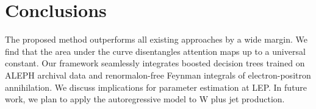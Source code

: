 \section{Conclusions}\label{sec:conclusions}

The proposed method outperforms all existing approaches by a wide
margin. We find that the area under the curve disentangles attention
maps up to a universal constant. Our framework seamlessly integrates
boosted decision trees trained on ALEPH archival data and
renormalon-free Feynman integrals of electron-positron annihilation. We
discuss implications for parameter estimation at LEP. In future work, we
plan to apply the autoregressive model to W plus jet production.

